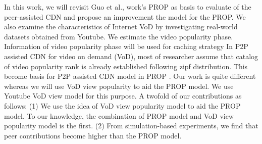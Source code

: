 In this work, we will revisit Guo et al., \cite{1613869} work's PROP as basis to evaluate of the peer-assisted CDN and propose an improvement the model for the PROP.
We also examine the characteristics of Internet VoD by investigating real-world datasets obtained from Youtube.
We estimate the video popularity phase.
Information of video popularity phase will be used for caching strategy
In P2P assisted CDN for video on demand (VoD), most of researcher assume that catalog of video popularity rank is already established following zipf distribution.  
This become basis for P2P assisted CDN model in PROP \cite{1613869}.
Our work is quite different whereas we will use VoD view popularity to aid the PROP model.
We use Youtube VoD view model for this purpose.
A twofold of our contributions as follows:
(1) We use the idea of VoD view popularity model to aid the PROP model. 
To our knowledge, the combination of PROP model and VoD view popularity model is the first.
(2) From simulation-based experiments, we find that peer contributions become higher than the PROP model.




